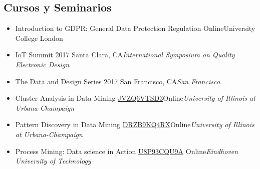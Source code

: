 \documentclass[11pt,letterpaper,sans]{moderncv}        %
\begin{document}
\subsection{Cursos y Seminarios}

\vspace{5pt}

\begin{itemize}



\item{
{Introduction to GDPR: General Data Protection Regulation}
{Online}{University College London}
{}}

\item{
{IoT Summit 2017 }{Santa Clara, CA}{\textit{International Symposium on Quality Electronic Design}}{}}

\item{
{The Data and Design Series 2017 }{San Francisco, CA}{\textit{San Francisco.}}{}}

\item{
{Cluster Analysis in Data Mining \href{hhttps://www.coursera.org/account/accomplishments/certificate/JVZQ6VTSD3}{JVZQ6VTSD3}}{Online}{\textit{University of Illinois at Urbana-Champaign}}{}}

\item{
{Pattern Discovery in Data Mining \href{https://www.coursera.org/account/accomplishments/certificate/DRZB9KQ4RX}{DRZB9KQ4RX}}{Online}{\textit{University of Illinois at Urbana-Champaign}}{}}

\item{
{Process Mining: Data science in Action  \href{https://www.coursera.org/account/accomplishments/certificate/U8P93CQU9A}{U8P93CQU9A} }{Online}{\textit{Eindhoven University of Technology }}{}}






\end{itemize}
\end{document}
